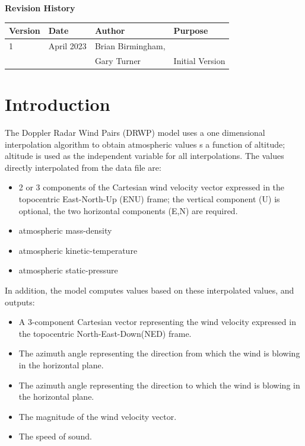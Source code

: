 \documentclass[11pt,fleqn]{report}
\begin{document}
\pagestyle{empty}
\titlePage
{}
\tableofcontents %
\vfill

{\Large \textbf {Revision History}}

\begin{tabular}{| m{}| m{} | m{} | m{} |} \hline
 \textbf{Version} & \textbf{Date} & \textbf{Author} & \textbf{Purpose} \\
\hline
1 & April 2023 & Brian Birmingham,&  \\
  &            & Gary Turner      & Initial Version \\ \hline
\end{tabular}


\chapter{Introduction} %
\pagestyle{plain}
The Doppler Radar Wind Pairs (DRWP) model uses a one dimensional interpolation
algorithm to obtain atmospheric values s a function of altitude; altitude is
used as the independent variable for all interpolations.
The values directly interpolated from the data file are:
\begin{itemize}
\item 2 or 3 components of the Cartesian wind velocity vector expressed in
the topocentric East-North-Up (ENU) frame; the vertical component (U) is
optional, the two horizontal components (E,N) are required.
\item atmospheric mass-density
\item atmospheric kinetic-temperature
\item atmospheric static-pressure
\end{itemize}

In addition, the model computes values based on these interpolated values,
and outputs:
\begin{itemize}
\item A 3-component Cartesian vector representing the wind velocity
expressed in the topocentric North-East-Down(NED) frame.
\item The azimuth angle representing the direction from which the wind is
blowing in the horizontal plane.
\item The azimuth angle representing the direction to which the wind is
blowing in the horizontal plane.
\item The magnitude of the wind velocity vector.
\item The speed of sound.
\end{itemize}
\end{document}
